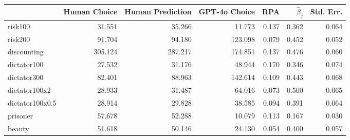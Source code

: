 \begin{tabular}{lrrrrrr}
\toprule
 & Human Choice   & Human Prediction & GPT-4o Choice & RPA & $\hat{\beta}_j$ & Std. Err.  \\
\midrule
risk100 & 31.551 & 35.266 & 11.773 & 0.137 & 0.362 & 0.064 \\
risk200 & 91.704 & 94.180 & 123.098 & 0.079 & 0.452 & 0.052 \\
discounting & 305.124 & 287.217 & 174.851 & 0.137 & 0.476 & 0.060 \\
dictator100 & 27.532 & 31.176 & 48.944 & 0.170 & 0.346 & 0.074 \\
dictator300 & 82.401 & 88.963 & 142.614 & 0.109 & 0.443 & 0.068 \\
dictator100x2 & 28.933 & 31.487 & 64.016 & 0.073 & 0.500 & 0.065 \\
dictator100x0.5 & 28.914 & 29.828 & 38.585 & 0.094 & 0.391 & 0.064 \\
prisoner & 57.678 & 52.288 & 10.079 & 0.113 & 0.167 & 0.030 \\
beauty & 51.618 & 50.146 & 24.130 & 0.054 & 0.400 & 0.057 \\
\bottomrule
\end{tabular}
